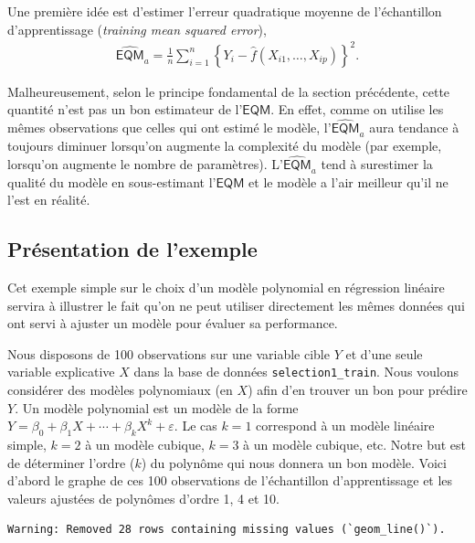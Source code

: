 \documentclass[
  11pt,
  letterpaper,
]{scrbook}
\theoremstyle{definition}
\theoremstyle{remark}
\begin{document}
Une première idée est d'estimer l'erreur quadratique moyenne de
l'échantillon d'apprentissage (\emph{training mean squared error}),
\begin{align*}
\widehat{\mathsf{EQM}}_a= \frac{1}{n}\sum_{i=1}^n \left\{Y_i-\widehat{f}(X_{i1}, \ldots, X_{ip})\right\}^2.
\end{align*}

Malheureusement, selon le principe fondamental de la section précédente,
cette quantité n'est pas un bon estimateur de l'\(\mathsf{EQM}\). En
effet, comme on utilise les mêmes observations que celles qui ont estimé
le modèle, l'\(\widehat{\mathsf{EQM}}_a\) aura tendance à toujours
diminuer lorsqu'on augmente la complexité du modèle (par exemple,
lorsqu'on augmente le nombre de paramètres).
L'\(\widehat{\mathsf{EQM}}_a\) tend à surestimer la qualité du modèle en
sous-estimant l'\(\mathsf{EQM}\) et le modèle a l'air meilleur qu'il ne
l'est en réalité.

\hypertarget{pruxe9sentation-de-lexemple}{%
\subsection{Présentation de
l'exemple}\label{pruxe9sentation-de-lexemple}}

Cet exemple simple sur le choix d'un modèle polynomial en régression
linéaire servira à illustrer le fait qu'on ne peut utiliser directement
les mêmes données qui ont servi à ajuster un modèle pour évaluer sa
performance.

Nous disposons de 100 observations sur une variable cible \(Y\) et d'une
seule variable explicative \(X\) dans la base de données
\texttt{selection1\_train}. Nous voulons considérer des modèles
polynomiaux (en \(X\)) afin d'en trouver un bon pour prédire \(Y\). Un
modèle polynomial est un modèle de la forme
\(Y=\beta_0 + \beta_1X+\cdots+\beta_kX^k+\varepsilon\). Le cas \(k=1\)
correspond à un modèle linéaire simple, \(k=2\) à un modèle cubique,
\(k=3\) à un modèle cubique, etc. Notre but est de déterminer l'ordre
(\(k\)) du polynôme qui nous donnera un bon modèle. Voici d'abord le
graphe de ces 100 observations de l'échantillon d'apprentissage et les
valeurs ajustées de polynômes d'ordre 1, 4 et 10.

\begin{verbatim}
Warning: Removed 28 rows containing missing values (`geom_line()`).
\end{verbatim}
\end{document}
